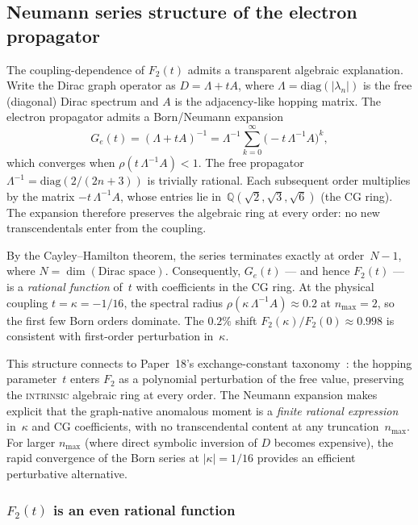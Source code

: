 \documentclass[11pt]{article}
\begin{document}
\subsection{Neumann series structure of the electron propagator}
\label{sec:neumann_series}

The coupling-dependence of $F_2(t)$ admits a transparent algebraic
explanation.  Write the Dirac graph operator as $D = \Lambda + tA$,
where $\Lambda = \mathrm{diag}(|\lambda_n|)$ is the free (diagonal)
Dirac spectrum and $A$ is the adjacency-like hopping matrix.  The
electron propagator admits a Born/Neumann expansion
\[
  G_e(t) = (\Lambda + tA)^{-1}
  = \Lambda^{-1} \sum_{k=0}^{\infty} \bigl(-t\,\Lambda^{-1}A\bigr)^k,
\]
which converges when $\rho(t\,\Lambda^{-1}A) < 1$.  The free propagator
$\Lambda^{-1} = \mathrm{diag}(2/(2n+3))$ is trivially rational.  Each
subsequent order multiplies by the matrix $-t\,\Lambda^{-1}A$, whose
entries lie in~$\mathbb{Q}(\sqrt{2},\sqrt{3},\sqrt{6})$ (the CG ring).
The expansion therefore preserves the algebraic ring at every order:
no new transcendentals enter from the coupling.

By the Cayley--Hamilton theorem, the series terminates exactly at
order~$N-1$, where $N = \dim(\text{Dirac space})$.  Consequently,
$G_e(t)$ --- and hence $F_2(t)$ --- is a \emph{rational function} of~$t$
with coefficients in the CG ring.  At the physical coupling
$t = \kappa = -1/16$, the spectral radius
$\rho(\kappa\,\Lambda^{-1}A) \approx 0.2$ at $n_{\max} = 2$,
so the first few Born orders dominate.  The $0.2\%$ shift
$F_2(\kappa)/F_2(0) \approx 0.998$ is consistent with first-order
perturbation in~$\kappa$.

This structure connects to Paper~18's exchange-constant
taxonomy~\cite{paper18}: the hopping parameter~$t$ enters $F_2$ as a
polynomial perturbation of the free value, preserving the
\textsc{intrinsic} algebraic ring at every order.  The Neumann
expansion makes explicit that the graph-native anomalous moment is a
\emph{finite rational expression} in~$\kappa$ and CG coefficients,
with no transcendental content at any truncation~$n_{\max}$.
For larger $n_{\max}$ (where direct symbolic inversion of $D$ becomes
expensive), the rapid convergence of the Born series at
$|\kappa| = 1/16$ provides an efficient perturbative alternative.

\subsubsection{$F_2(t)$ is an even rational function}
\label{sec:f2_even}
\end{document}
